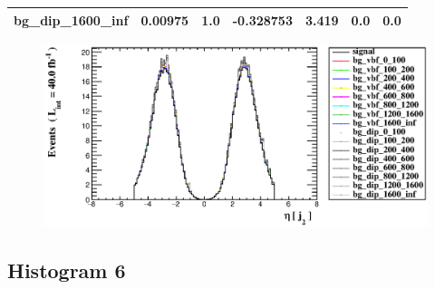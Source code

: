 \documentclass[a4paper, 10pt]{article}
\begin{document}
\begin{table}[H]
\begin{center}
\begin{tabular}{|m{23.0mm}|m{23.0mm}|m{18.0mm}|m{19.0mm}|m{19.0mm}|m{19.0mm}|m{19.0mm}|}
      \hline
      {\cellcolor{white}         bg\_dip\_1600\_inf}& {\cellcolor{white}         0.00975}& {\cellcolor{white}         1.0}& {\cellcolor{white}         -0.328753}& {\cellcolor{white}         3.419}& {\cellcolor{green}         0.0}& {\cellcolor{green}         0.0}\\
\hline
    \end{tabular}
  \end{center}
\end{table}

\begin{figure}[H]
  \begin{center}
    \includegraphics[scale=0.45]{selection_4.eps}\\
\caption{   }
  \end{center}
\end{figure}
      \newpage
\subsection{ Histogram 6}
\end{document}
